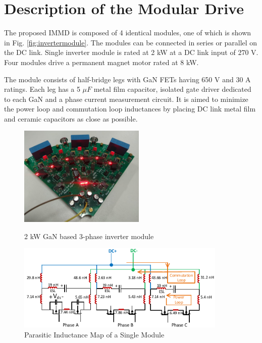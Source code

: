 
\section{Description of the Modular Drive}

The proposed IMMD is composed of 4 identical modules, one of which is shown in Fig. \ref{fig:invertermodule}. The modules can be connected in series or parallel on the DC link. Single inverter module is rated at 2 kW at a DC link input of 270 V. Four modules drive a permanent magnet motor rated at 8 kW.

The module consists of half-bridge legs with GaN FETs having 650 V and 30 A ratings. Each leg has a 5 $\mu F$ metal film capacitor, isolated gate driver dedicated to each GaN and a phase current measurement circuit. It is aimed to minimize the power loop and commutation loop inductances by placing DC link metal film and ceramic capacitors as close as possible.

\begin{figure}[tb]
\begin{minipage}[b]{.4\linewidth}
\centering
\includegraphics[width=6cm]{figures/invertermodule.jpg}
\caption{2 kW GaN based 3-phase inverter module}
\label{fig:invertermodule}
\end{minipage}%
\begin{minipage}[b]{.6\linewidth}
\centering
\includegraphics[width=10cm]{figures/SingleModuleInductanceMap.pdf}
\caption{Parasitic Inductance Map of a Single Module}
\label{fig:SingleModuleInductanceMap}
\end{minipage}
\end{figure}

